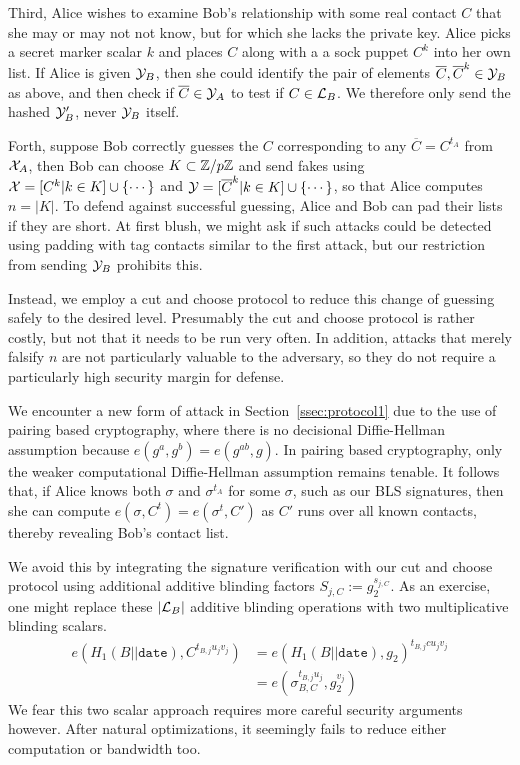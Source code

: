\documentclass{article}
\begin{document}
Third, Alice wishes to examine Bob's relationship with some real
contact $C$ that she may or may not not know, but for which she
lacks the private key.  Alice picks a secret marker scalar $k$
and places $C$ along with a a sock puppet $C^k$ into her own list.
If Alice is given ${\cal Y}_B$, then she could identify the pair
of elements  $\overline{C}, \overline{C}^k \in {\cal Y}_B$
 as above, and then check if $\overline{C} \in {\cal Y}_A$
to test if $C \in {\cal L}_B$.  We therefore only send
the hashed ${\cal Y}'_B$, never ${\cal Y}_B$ itself.


Forth, suppose Bob correctly guesses the $C$ corresponding to
 any $\overline{C} = C^{t_A}$ from ${\cal X}_A$, then
Bob can choose $K \subset \mathbb{Z}/p\mathbb{Z}$ and send fakes using
 ${\cal X} = [  C^k  |  k \in K  ] \cup \{ \cdots \}$ and
 ${\cal Y} = [  \overline{C}^k  |  k \in K  ] \cup \{ \cdots \}$,
so that Alice computes $n = |K|$.
To defend against successful guessing,
Alice and Bob can pad their lists if they are short.
At first blush, we might ask if such attacks could be detected using
padding with tag contacts similar to the first attack, but
our restriction from sending ${\cal Y}_B$ prohibits this.

Instead, we employ a cut and choose protocol to reduce this
change of guessing safely to the desired level.
Presumably the cut and choose protocol is rather costly, but
not that it needs to be run very often.  In addition, attacks that
merely falsify $n$ are not particularly valuable to the adversary, so
they do not require a particularly high security margin for defense.

We encounter a new form of attack in Section~\ref{ssec:protocol1}
due to the use of pairing based cryptography, where
there is no decisional Diffie-Hellman assumption because
$e(g^a,g^b) = e(g^{ab},g)$.  In pairing based cryptography, only the
weaker computational Diffie-Hellman assumption remains tenable.
It follows that, if Alice knows both $\sigma$ and
 $\sigma^{t_A}$ for some $\sigma$, such as our BLS signatures,
then she can compute $e(\sigma,C^t) = e(\sigma^t,C')$ as
 $C'$ runs over all known contacts,
thereby revealing Bob's contact list.

We avoid this by integrating the signature verification with our
cut and choose protocol using additional additive blinding factors
$S_{j,C} := g_2^{s_{j,C}}$.
As an exercise, one might replace these $|{\cal L}_B|$ additive
blinding operations with two multiplicative blinding scalars.
\begin{align*}
e( H_1(B||\texttt{date}), C^{t_{B,j} u_j v_j} )
 &= e( H_1(B||\texttt{date}), g_2 )^{t_{B,j} c u_j v_j} \\
 &= e( \sigma_{B,C}^{t_{B,j} u_j}, g_2^{v_j} )
\end{align*}
We fear this two scalar approach requires more careful security
arguments however.
After natural optimizations, it seemingly fails to reduce either
computation or bandwidth too.
\end{document}
